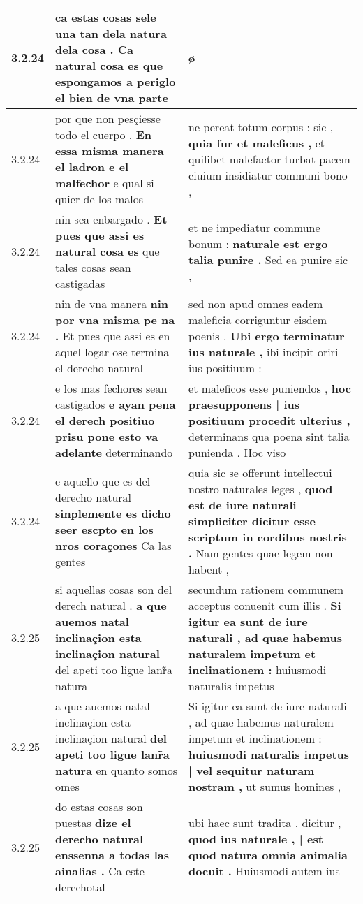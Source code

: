 \begin{tabular}{|p{1cm}|p{6.5cm}|p{6.5cm}|}
3.2.24 & ca estas cosas sele una tan dela natura dela cosa . \textbf{ Ca natural cosa es } que espongamos a periglo el bien de vna parte & ø \\\hline
3.2.24 & por que non pesçiesse todo el cuerpo . \textbf{ En essa misma manera el ladron e el malfechor } e qual si quier de los malos & ne pereat totum corpus : sic , \textbf{ quia fur et maleficus , } et quilibet malefactor turbat pacem ciuium insidiatur communi bono , \\\hline
3.2.24 & nin sea enbargado . \textbf{ Et pues que assi es natural cosa es } que tales cosas sean castigadas & et ne impediatur commune bonum : \textbf{ naturale est ergo talia punire . } Sed ea punire sic , \\\hline
3.2.24 & nin de vna manera \textbf{ nin por vna misma pe na . } Et pues que assi es en aquel logar ose termina el derecho natural & sed non apud omnes eadem maleficia corriguntur eisdem poenis . \textbf{ Ubi ergo terminatur ius naturale , } ibi incipit oriri ius positiuum : \\\hline
3.2.24 & e los mas fechores sean castigados \textbf{ e ayan pena el derech positiuo prisu pone esto va adelante } determinando & et maleficos esse puniendos , \textbf{ hoc praesupponens | ius positiuum procedit ulterius , } determinans qua poena sint talia punienda . Hoc viso \\\hline
3.2.24 & e aquello que es del derecho natural \textbf{ sinplemente es dicho seer escpto en los nros coraçones } Ca las gentes & quia sic se offerunt intellectui nostro naturales leges , \textbf{ quod est de iure naturali simpliciter dicitur esse scriptum in cordibus nostris . } Nam gentes quae legem non habent , \\\hline
3.2.25 & si aquellas cosas son del derech natural . \textbf{ a que auemos natal inclinaçion esta inclinaçion natural } del apeti too ligue lanr̃a natura & secundum rationem communem acceptus conuenit cum illis . \textbf{ Si igitur ea sunt de iure naturali , ad quae habemus naturalem impetum et inclinationem : } huiusmodi naturalis impetus \\\hline
3.2.25 & a que auemos natal inclinaçion esta inclinaçion natural \textbf{ del apeti too ligue lanr̃a natura } en quanto somos omes & Si igitur ea sunt de iure naturali , ad quae habemus naturalem impetum et inclinationem : \textbf{ huiusmodi naturalis impetus | vel sequitur naturam nostram , } ut sumus homines , \\\hline
3.2.25 & do estas cosas son puestas \textbf{ dize el derecho natural enssenna a todas las ainalias . } Ca este derechotal & ubi haec sunt tradita , dicitur , \textbf{ quod ius naturale , | est quod natura omnia animalia docuit . } Huiusmodi autem ius \\\hline

\end{tabular}
